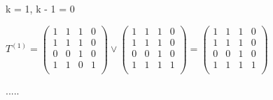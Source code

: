 \documentclass{article}
\begin{document}
\begin{center}
	k = 1, \hspace{5mm} k - 1 = 0
\end{center}
\vspace{5mm}
\par
\hspace{8mm} $T^{(1)} = 
\begin{pmatrix}
	1 & 1 & 1 & 0\\
	1 & 1 & 1 & 0\\
	0 & 0 & 1 & 0\\
	1 & 1 & 0 & 1\\
\end{pmatrix} \vee
\begin{pmatrix}
	1 & 1 & 1 & 0\\
	1 & 1 & 1 & 0\\
	0 & 0 & 1 & 0\\
	1 & 1 & 1 & 1\\
\end{pmatrix} = 
\begin{pmatrix}
	1 & 1 & 1 & 0\\
	1 & 1 & 1 & 0\\
	0 & 0 & 1 & 0\\
	1 & 1 & 1 & 1\\
\end{pmatrix}$
\vspace{5mm}
\begin{center}
	.....
\end{center}
\end{document}
